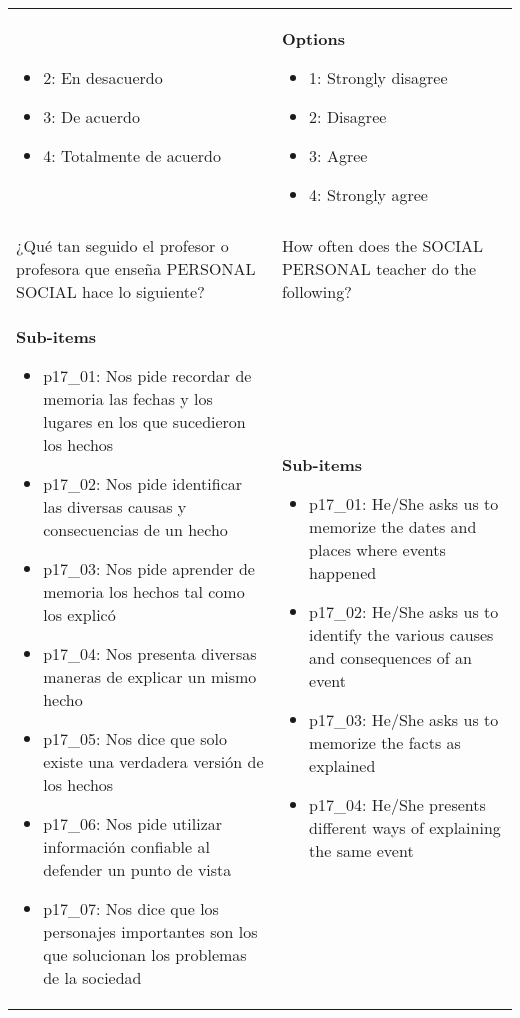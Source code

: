 \documentclass[11pt]{article}
\begin{document}
\begin{longtable}{@{}LL@{}}
\begin{itemize}[leftmargin=*]
\item 2: En desacuerdo
\item 3: De acuerdo
\item 4: Totalmente de acuerdo\end{itemize} & \textbf{Options}\par\begin{itemize}[leftmargin=*]\item 1: Strongly disagree
\item 2: Disagree
\item 3: Agree
\item 4: Strongly agree\end{itemize} \\
\addlinespace[4pt]
 \\ 
¿Qué tan seguido el profesor o profesora que enseña PERSONAL SOCIAL hace lo siguiente? & How often does the SOCIAL PERSONAL teacher do the following? \\
\textbf{Sub-items}\par\begin{itemize}[leftmargin=*]\item p17\_01: Nos pide recordar de memoria las fechas y los lugares en los que sucedieron los hechos
\item p17\_02: Nos pide identificar las diversas causas y consecuencias de un hecho
\item p17\_03: Nos pide aprender de memoria los hechos tal como los explicó
\item p17\_04: Nos presenta diversas maneras de explicar un mismo hecho
\item p17\_05: Nos dice que solo existe una verdadera versión de los hechos
\item p17\_06: Nos pide utilizar información confiable al defender un punto de vista
\item p17\_07: Nos dice que los personajes importantes son los que solucionan los problemas de la sociedad\end{itemize} & \textbf{Sub-items}\par\begin{itemize}[leftmargin=*]\item p17\_01: He/She asks us to memorize the dates and places where events happened
\item p17\_02: He/She asks us to identify the various causes and consequences of an event
\item p17\_03: He/She asks us to memorize the facts as explained
\item p17\_04: He/She presents different ways of explaining the same event

\end{itemize}
\end{longtable}
\end{document}
